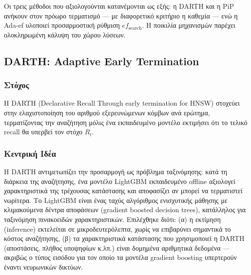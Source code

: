 \documentclass[12pt,a4paper]{article}
\begin{document}
Οι τρεις μέθοδοι που αξιολογούνται κατανέμονται ως εξής: η DARTH και η PiP ανήκουν στον πρόωρο τερματισμό --- με διαφορετικό κριτήριο η καθεμία --- ενώ η Ada-ef υλοποιεί προσαρμοστική ρύθμιση $ef_{\text{search}}$. Η ποικιλία μηχανισμών παρέχει ολοκληρωμένη κάλυψη του χώρου λύσεων.

\subsection{DARTH: Adaptive Early Termination}

\subsubsection*{Στόχος}
Η DARTH (Declarative Recall Through early termination for HNSW) \cite{darth2025} στοχεύει στην ελαχιστοποίηση του αριθμού εξερευνώμενων κόμβων ανά ερώτημα, τερματίζοντας την αναζήτηση μόλις ένα εκπαιδευμένο μοντέλο εκτιμήσει ότι το τελικό recall θα υπερβεί τον στόχο $R_t$.

\subsubsection*{Κεντρική Ιδέα}
Η DARTH αντιμετωπίζει την προσαρμογή ως πρόβλημα ταξινόμησης: κατά τη διάρκεια της αναζήτησης, ένα μοντέλο LightGBM εκπαιδευμένο offline αξιολογεί χαρακτηριστικά της τρέχουσας κατάστασης και αποφασίζει αν μπορεί να τερματιστεί νωρίτερα. Το LightGBM είναι ένας ταχύς αλγόριθμος ενισχυτικής μάθησης με κλιμακούμενα δέντρα αποφάσεων (gradient boosted decision trees), κατάλληλος για ταξινόμηση πινακοειδών χαρακτηριστικών. Επιλέχθηκε διότι: (α) η εκτίμηση (inference) εκτελείται σε μικροδευτερόλεπτα, χωρίς να επιβαρύνει σημαντικά το κόστος αναζήτησης, (β) τα χαρακτηριστικά κατάστασης που χρησιμοποιεί η DARTH (αποστάσεις, πλήθος υποψηφίων κ.λπ.) είναι δομημένα αριθμητικά δεδομένα --- ακριβώς ο τύπος εισόδου για τον οποίο τα μοντέλα gradient boosting υπερτερούν έναντι νευρωνικών δικτύων.
\end{document}
